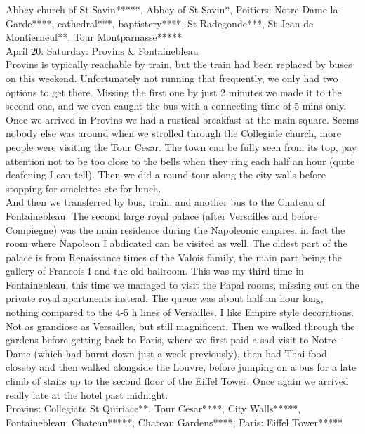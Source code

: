 Abbey church of St Savin*****, Abbey of St Savin*, Poitiers: Notre-Dame-la-Garde****, cathedral***, baptistery****, St Radegonde***, St Jean de Montierneuf**, Tour Montparnasse*****\\

April 20: Saturday: Provins \& Fontainebleau\\
Provins is typically reachable by train, but the train had been replaced by buses on this weekend. Unfortunately not running that frequently, we only had two options to get there. Missing the first one by just 2 minutes we made it to the second one, and we even caught the bus with a connecting time of 5 mins only. Once we arrived in Provins we had a rustical breakfast at the main square. Seems nobody else was around when we strolled through the Collegiale church, more people were visiting the Tour Cesar. The town can be fully seen from its top, pay attention not to be too close to the bells when they ring each half an hour (quite deafening I can tell). Then we did a round tour along the city walls before stopping for omelettes etc for lunch. \\
And then we transferred by bus, train, and another bus to the Chateau of Fontainebleau. The second large royal palace (after Versailles and before Compiegne) was the main residence during the Napoleonic empires, in fact the room where Napoleon I abdicated can be visited as well. The oldest part of the palace is from Renaissance times of the Valois family, the main part being the gallery of Francois I and the old ballroom. This was my third time in Fontainebleau, this time we managed to visit the Papal rooms, missing out on the private royal apartments instead. The queue was about half an hour long, nothing compared to the 4-5 h lines of Versailles. I like Empire style decorations. Not as grandiose as Versailles, but still magnificent. Then we walked through the gardens before getting back to Paris, where we first paid a sad visit to Notre-Dame (which had burnt down just a week previously), then had Thai food closeby and then walked alongside the Louvre, before jumping on a bus for a late climb of stairs up to the second floor of the Eiffel Tower. Once again we arrived really late at the hotel past midnight.\\

Provins: Collegiate St Quiriace**, Tour Cesar****, City Walls*****, Fontainebleau: Chateau*****, Chateau Gardens****, Paris: Eiffel Tower*****\\


